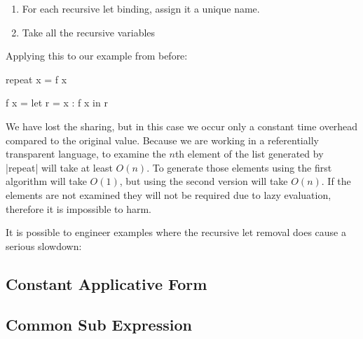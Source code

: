 \begin{enumerate}
\item For each recursive let binding, assign it a unique name.
\item Take all the recursive variables
\end{enumerate}

Applying this to our example from before:

\begin{code}
repeat x = f x

f x =  let r = x : f x
       in r
\end{code}

We have lost the sharing, but in this case we occur only a constant time overhead compared to the original value. Because we are working in a referentially transparent language, to examine the $n$th element of the list generated by |repeat| will take at least $O(n)$. To generate those elements using the first algorithm will take $O(1)$, but using the second version will take $O(n)$. If the elements are not examined they will not be required due to lazy evaluation, therefore it is impossible to harm.

It is possible to engineer examples where the recursive let removal does cause a serious slowdown:



\subsection{Constant Applicative Form}


\subsection{Common Sub Expression}


